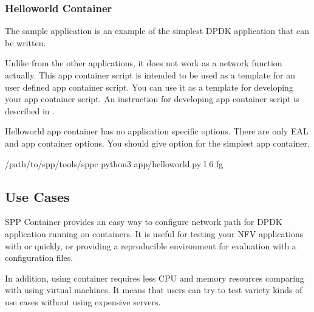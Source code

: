\documentclass[a4paper,11pt,openany,oneside,english]{sphinxmanual}
\begin{document}
\subsubsection{Helloworld Container}
\label{\detokenize{tools/sppc/app_launcher:helloworld-container}}\label{\detokenize{tools/sppc/app_launcher:sppc-appl-helloworld}}
The 
sample application is an example of the simplest DPDK application
that can be written.

Unlike from the other applications, it does not work as a network
function actually.
This app container script  is intended to be used
as a template for an user defined app container script.
You can use it as a template for developing your app container script.
An instruction for developing app container script is described in
{\hyperref[\detokenize{tools/sppc/howto_launcher:sppc-howto-define-appc}]{}}.

Helloworld app container has no application specific options. There are
only EAL and app container options.
You should give  option for the simplest app container.

\begin{sphinxVerbatim}[commandchars=\\\{\},formatcom=\footnotesize]
  /path/to/spp/tools/sppc
 python3 app/helloworld.py \PYGZhy{}l \PYGZhy{}6 \PYGZhy{}fg
\end{sphinxVerbatim}


\subsection{Use Cases}
\label{\detokenize{tools/sppc/usecases:use-cases}}\label{\detokenize{tools/sppc/usecases:spp-container-usecases}}\label{\detokenize{tools/sppc/usecases::doc}}
SPP Container provides an easy way to configure network path
for DPDK application running on containers.
It is useful for testing your NFV applications with  or
 quickly, or providing a reproducible environment for evaluation
with a configuration files.

In addition, using container requires less CPU and memory resources
comparing with using virtual machines.
It means that users can try to test variety kinds of use cases without
using expensive servers.
\end{document}
